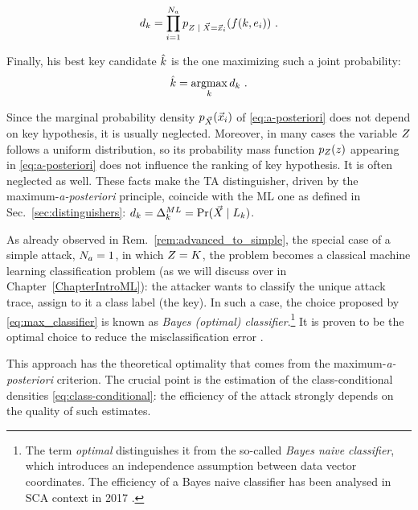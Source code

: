 \begin{equation}\label{eq:joint_distr}
d_{\keyVar} = \prod_{i=1}^{\nbAttackTraces} \pdf_{\given{\sensRandVar}{\vaLeakVec = \vLeakVec_i}}(\sensFunction(\keyVar,\publicParVar_i) ) \mbox{ .}
\end{equation}

Finally, his best key candidate $\hat{k}$ is the one maximizing such a joint probability:
\begin{equation}\label{eq:max_classifier}
\hat{k} = \operatorname*{argmax}_{k} d_{k} \mbox{ .}
\end{equation}

\begin{remark}Since the marginal probability density $p_{\vec{X}}(\vec{x}_i)$ of \eqref{eq:a-posteriori} does not depend on key hypothesis, it is usually neglected. Moreover, in many cases the variable $Z$ follows a uniform distribution, so its probability mass function $p_{Z}(z)$ appearing in \eqref{eq:a-posteriori}  does not influence the ranking of key hypothesis. It is often neglected as well. These facts make the TA distinguisher, driven by the maximum-\textit{a-posteriori} principle, coincide with the ML one as defined in Sec.~\ref{sec:distinguishers}: $d_{\keyVar} = \distinguisher^{ML}_{\keyVar} = \prob(\given{\vaLeakVec}{\leakageModel_\keyVar})$.
\end{remark}

\begin{remark}
As already observed in Rem.~\ref{rem:advanced_to_simple}, the special case of a simple attack, \ie $N_a = 1$, in which $Z = K$, the problem becomes a classical machine learning classification problem (as we will discuss over in Chapter~\ref{ChapterIntroML}): the attacker wants to classify the unique attack trace, \ie assign to it a class label (the key). In such a case, the choice proposed by \eqref{eq:max_classifier} is known as \emph{Bayes (optimal) classifier}.\footnote{The term \emph{optimal} distinguishes it from the so-called \emph{Bayes naive classifier}, which introduces an independence assumption between data vector coordinates. The efficiency of a Bayes naive classifier has been analysed in SCA context in 2017 \cite{picek2017template}.} It is proven to be the optimal choice to reduce the misclassification error \cite{christopher2006pattern}.
\end{remark}

This approach has the theoretical optimality that comes from the maximum-\textit{a-posteriori} criterion. The crucial point is the estimation of the class-conditional densities \eqref{eq:class-conditional}: the efficiency of the attack strongly depends on the quality of such estimates. 

